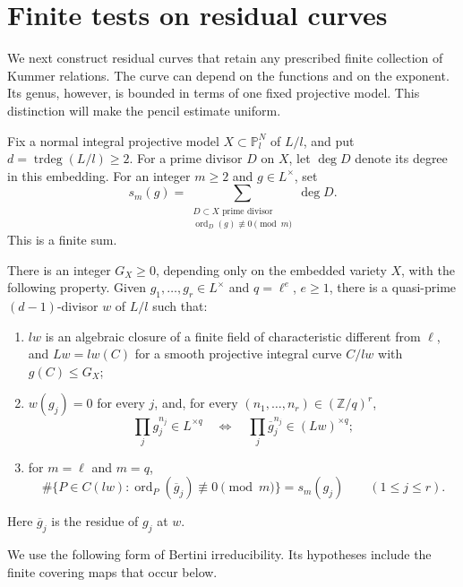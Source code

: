 \section{Finite tests on residual curves}\label{sec:residual-tests}\label{sec:tests}

We next construct residual curves that retain any prescribed finite collection
of Kummer relations.  The curve can depend on the functions and on the
exponent.  Its genus, however, is bounded in terms of one fixed projective
model.  This distinction will make the pencil estimate uniform.

Fix a normal integral projective model $X\subset\mathbb P^N_l$ of $L/l$,
and put $d=\operatorname{trdeg}(L/l)\ge2$.
For a prime divisor $D$ on $X$, let $\deg D$ denote its degree in this
embedding.  For an integer $m\ge2$ and $g\in L^\times$, set
\[
 s_m(g)=\sum_{\substack{D\subset X\text{ prime divisor}\\
                       \operatorname{ord}_D(g)\not\equiv0\pmod m}}
                 \deg D.
\]
This is a finite sum.

\begin{lemma}\label{tests:residual}
There is an integer $G_X\ge0$, depending only on the embedded variety $X$,
with the following property.  Given $g_1,\ldots,g_r\in L^\times$ and
$q=\ell^e$, $e\ge1$, there is a quasi-prime $(d-1)$-divisor $w$ of $L/l$
such that:
\begin{enumerate}
\item $lw$ is an algebraic closure of a finite field of characteristic
      different from $\ell$, and $Lw=lw(C)$ for a smooth projective integral
      curve $C/lw$ with $g(C)\le G_X$;
\item $w(g_j)=0$ for every $j$, and, for every
      $(n_1,\ldots,n_r)\in(\mathbb Z/q)^r$,
\[
 \prod_jg_j^{n_j}\in L^{\times q}
 \quad\Longleftrightarrow\quad
 \prod_j\overline g_j^{n_j}\in(Lw)^{\times q};
\]
\item for $m=\ell$ and $m=q$,
\begin{equation}\label{tests:support}
 \#\{P\in C(lw):\operatorname{ord}_P(\overline g_j)
                                  \not\equiv0\pmod m\}=s_m(g_j)
 \qquad(1\le j\le r).
\end{equation}
\end{enumerate}
Here $\overline g_j$ is the residue of $g_j$ at $w$.
\end{lemma}

We use the following form of Bertini irreducibility.  Its hypotheses include
the finite covering maps that occur below.

